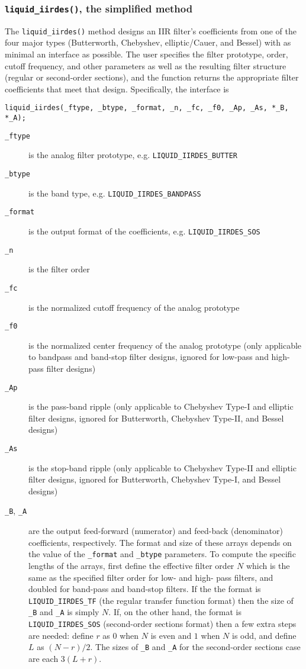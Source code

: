 \subsubsection{{\tt liquid\_iirdes()}, the simplified method}
\label{module:filter:iirdes:iirdes}
The {\tt liquid\_iirdes()} method designs an IIR filter's coefficients
from one of the four major types
(Butterworth, Chebyshev, elliptic/Cauer, and Bessel)
with as minimal an interface as possible.
The user specifies the filter prototype, order, cutoff frequency, and
other parameters as well as the resulting filter structure
(regular or second-order sections),
and the function returns the appropriate filter coefficients that meet
that design.
Specifically, the interface is
%
\begin{Verbatim}[fontsize=\small]
    liquid_iirdes(_ftype, _btype, _format, _n, _fc, _f0, _Ap, _As, *_B, *_A);
\end{Verbatim}
%
\begin{description}
\item[{\tt \_ftype}]
    is the analog filter prototype, e.g. {\tt LIQUID\_IIRDES\_BUTTER}
\item[{\tt \_btype}]
    is the band type, e.g. {\tt LIQUID\_IIRDES\_BANDPASS}
\item[{\tt \_format}]
    is the output format of the coefficients, e.g. {\tt LIQUID\_IIRDES\_SOS}
\item[{\tt \_n}]
    is the filter order
\item[{\tt \_fc}]
    is the normalized cutoff frequency of the analog prototype
\item[{\tt \_f0}]
    is the normalized center frequency of the analog prototype (only
    applicable to bandpass and band-stop filter designs, ignored for low-pass
    and high-pass filter designs)
\item[{\tt \_Ap}]
    is the pass-band ripple (only applicable to Chebyshev Type-I and elliptic
    filter designs, ignored for Butterworth, Chebyshev Type-II, and Bessel
    designs)
\item[{\tt \_As}]
    is the stop-band ripple (only applicable to Chebyshev Type-II and elliptic
    filter designs, ignored for Butterworth, Chebyshev Type-I, and Bessel
    designs)
\item[{\tt \_B}, {\tt \_A}]
    are the output feed-forward (numerator) and feed-back (denominator)
    coefficients, respectively.
    The format and size of these arrays depends on the value of the
    {\tt \_format} and {\tt \_btype} parameters.
    To compute the specific lengths of the arrays, first define the
    effective filter order $N$ which is the same as the specified filter
    order for low- and high- pass filters, and doubled for band-pass and
    band-stop filters.
    If the the format is {\tt LIQUID\_IIRDES\_TF}
    (the regular transfer function format)
    then the size of {\tt \_B} and {\tt \_A} is simply $N$.
    If, on the other hand, the format is {\tt LIQUID\_IIRDES\_SOS}
    (second-order sections format) then a few extra steps are needed:
    define $r$ as $0$ when $N$ is even and $1$ when $N$ is odd, and
    define $L$ as $(N-r)/2$.
    The sizes of {\tt \_B} and {\tt \_A} for the second-order sections
    case are each $3(L+r)$.
\end{description}
